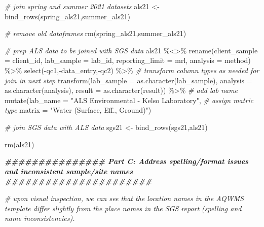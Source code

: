 \documentclass[
]{book}
\newenvironment{Shaded}{\begin{snugshade}}{\end{snugshade}}
\newcommand{\AttributeTok}[1]{\textcolor[rgb]{0.77,0.63,0.00}{#1}}
\newcommand{\CommentTok}[1]{\textcolor[rgb]{0.56,0.35,0.01}{\textit{#1}}}
\newcommand{\DocumentationTok}[1]{\textcolor[rgb]{0.56,0.35,0.01}{\textbf{\textit{#1}}}}
\newcommand{\FunctionTok}[1]{\textcolor[rgb]{0.00,0.00,0.00}{#1}}
\newcommand{\NormalTok}[1]{#1}
\newcommand{\OtherTok}[1]{\textcolor[rgb]{0.56,0.35,0.01}{#1}}
\newcommand{\SpecialCharTok}[1]{\textcolor[rgb]{0.00,0.00,0.00}{#1}}
\newcommand{\StringTok}[1]{\textcolor[rgb]{0.31,0.60,0.02}{#1}}
\begin{document}
\begin{Shaded}
\begin{Highlighting}[]
\CommentTok{\# join spring and summer 2021 datasets}
\NormalTok{als21 }\OtherTok{\textless{}{-}} \FunctionTok{bind\_rows}\NormalTok{(spring\_als21,summer\_als21)}

\CommentTok{\# remove old dataframes}
\FunctionTok{rm}\NormalTok{(spring\_als21,summer\_als21)}

\CommentTok{\# prep ALS data to be joined with SGS data}
\NormalTok{als21 }\SpecialCharTok{\%\textless{}\textgreater{}\%}
  \FunctionTok{rename}\NormalTok{(}\AttributeTok{client\_sample =}\NormalTok{ client\_id,}
         \AttributeTok{lab\_sample =}\NormalTok{ lab\_id,}
         \AttributeTok{reporting\_limit =}\NormalTok{ mrl,}
         \AttributeTok{analysis =}\NormalTok{ method) }\SpecialCharTok{\%\textgreater{}\%}
  \FunctionTok{select}\NormalTok{(}\SpecialCharTok{{-}}\NormalTok{qc1,}\SpecialCharTok{{-}}\NormalTok{data\_entry,}\SpecialCharTok{{-}}\NormalTok{qc2) }\SpecialCharTok{\%\textgreater{}\%}
  \CommentTok{\# transform column types as needed for join in next step}
  \FunctionTok{transform}\NormalTok{(}\AttributeTok{lab\_sample =} \FunctionTok{as.character}\NormalTok{(lab\_sample),}
            \AttributeTok{analysis =} \FunctionTok{as.character}\NormalTok{(analysis),}
            \AttributeTok{result =} \FunctionTok{as.character}\NormalTok{(result)) }\SpecialCharTok{\%\textgreater{}\%}
  \CommentTok{\# add lab name}
  \FunctionTok{mutate}\NormalTok{(}\AttributeTok{lab\_name =} \StringTok{"ALS Environmental {-} Kelso Laboratory"}\NormalTok{,}
         \CommentTok{\# assign matric type}
         \AttributeTok{matrix =} \StringTok{"Water (Surface, Eff., Ground)"}\NormalTok{)}

\CommentTok{\# join SGS data with ALS data}
\NormalTok{sgs21 }\OtherTok{\textless{}{-}} \FunctionTok{bind\_rows}\NormalTok{(sgs21,als21) }

\FunctionTok{rm}\NormalTok{(als21)}







\DocumentationTok{\#\#\#\#\#\#\#\#\#\#\#\#\#\#\# Part C: Address spelling/format issues and inconsistent sample/site names \#\#\#\#\#\#\#\#\#\#\#\#\#\#\#\#\#\#\#\#\#\#}

\CommentTok{\# upon visual inspection, we can see that the location names in the AQWMS template differ slightly from the place names in the SGS report (spelling and name inconsistencies).}


\end{Highlighting}
\end{Shaded}
\end{document}
